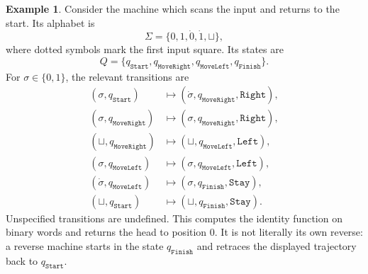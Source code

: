 \documentclass[12pt]{article}
\theoremstyle{plain}
\theoremstyle{definition}
\newtheorem{exmp}[thm]{Example}
\newcommand{\blank}{\sqcup}
\newcommand{\Start}{q_{\texttt{Start}}}
\newcommand{\Finish}{q_{\texttt{Finish}}}
\begin{document}
\begin{exmp}\label{ex:scan_return}
Consider the machine which scans the input and returns to the start. Its alphabet is
\[
\Sigma=\{0,1,\dot 0,\dot 1,\blank\},
\]
where dotted symbols mark the first input square. Its states are
\[
Q=\{\Start,q_{\texttt{MoveRight}},q_{\texttt{MoveLeft}},\Finish\}.
\]
For $\sigma\in\{0,1\}$, the relevant transitions are
\begin{align*}
(\sigma,\Start)&\longmapsto(\dot\sigma,q_{\texttt{MoveRight}},\texttt{Right}),\\
(\sigma,q_{\texttt{MoveRight}})&\longmapsto(\sigma,q_{\texttt{MoveRight}},\texttt{Right}),\\
(\blank,q_{\texttt{MoveRight}})&\longmapsto(\blank,q_{\texttt{MoveLeft}},\texttt{Left}),\\
(\sigma,q_{\texttt{MoveLeft}})&\longmapsto(\sigma,q_{\texttt{MoveLeft}},\texttt{Left}),\\
(\dot\sigma,q_{\texttt{MoveLeft}})&\longmapsto(\sigma,\Finish,\texttt{Stay}),\\
(\blank,\Start)&\longmapsto(\blank,\Finish,\texttt{Stay}).
\end{align*}
Unspecified transitions are undefined. This computes the identity function on binary words and returns the head to position $0$. It is not literally its own reverse: a reverse machine starts in the state $\Finish$ and retraces the displayed trajectory back to $\Start$.
\end{exmp}
\end{document}
